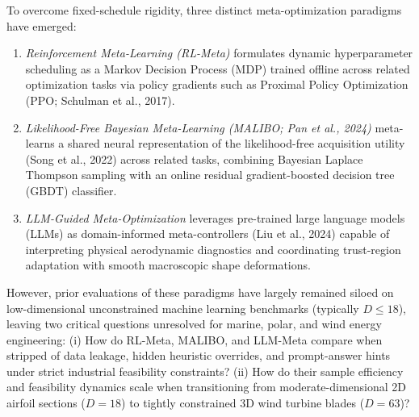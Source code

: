 \documentclass[11pt,fleqn,letterpaper]{article}
\begin{document}
To overcome fixed-schedule rigidity, three distinct meta-optimization paradigms have emerged:
\begin{enumerate}
\setlength{\itemsep}{1pt}\setlength{\parskip}{0pt}\setlength{\topsep}{2pt}
\item \emph{Reinforcement Meta-Learning (RL-Meta)} formulates dynamic hyperparameter scheduling as a Markov Decision Process (MDP) trained offline across related optimization tasks via policy gradients such as Proximal Policy Optimization (PPO; Schulman et al., 2017).
\item \emph{Likelihood-Free Bayesian Meta-Learning (MALIBO; Pan et al., 2024)} meta-learns a shared neural representation of the likelihood-free acquisition utility (Song et al., 2022) across related tasks, combining Bayesian Laplace Thompson sampling with an online residual gradient-boosted decision tree (GBDT) classifier.
\item \emph{LLM-Guided Meta-Optimization} leverages pre-trained large language models (LLMs) as domain-informed meta-controllers (Liu et al., 2024) capable of interpreting physical aerodynamic diagnostics and coordinating trust-region adaptation with smooth macroscopic shape deformations.
\end{enumerate}

However, prior evaluations of these paradigms have largely remained siloed on low-dimensional unconstrained machine learning benchmarks (typically $D \le 18$), leaving two critical questions unresolved for marine, polar, and wind energy engineering: (i) How do RL-Meta, MALIBO, and LLM-Meta compare when stripped of data leakage, hidden heuristic overrides, and prompt-answer hints under strict industrial feasibility constraints? (ii) How do their sample efficiency and feasibility dynamics scale when transitioning from moderate-dimensional 2D airfoil sections ($D=18$) to tightly constrained 3D wind turbine blades ($D=63$)?
\end{document}
